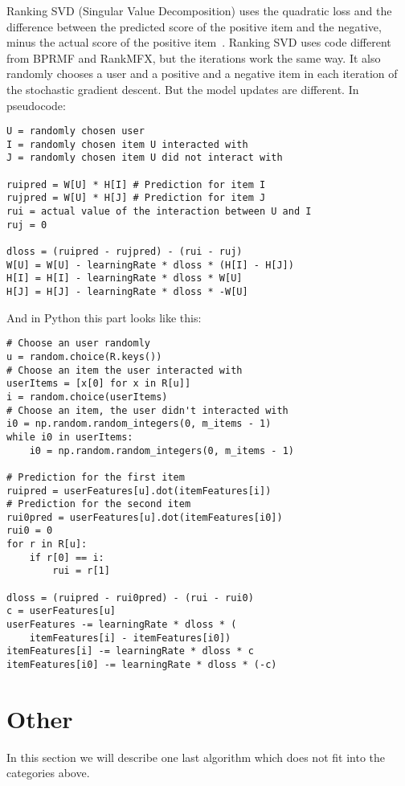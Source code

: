 Ranking SVD (Singular Value Decomposition) uses the quadratic loss and the difference between the
predicted score of the positive item and the negative, minus the actual
score of the positive item~\cite{jahrer2011collaborative}.
Ranking SVD uses code different from BPRMF and RankMFX, but the iterations
work the same way. It also randomly chooses a user and a positive and a
negative item in each iteration of the stochastic gradient descent. 
But the model updates are different. In pseudocode:
\begin{lstlisting}[style=pseudocode]
U = randomly chosen user
I = randomly chosen item U interacted with
J = randomly chosen item U did not interact with

ruipred = W[U] * H[I] # Prediction for item I
rujpred = W[U] * H[J] # Prediction for item J
rui = actual value of the interaction between U and I 
ruj = 0

dloss = (ruipred - rujpred) - (rui - ruj)
W[U] = W[U] - learningRate * dloss * (H[I] - H[J])
H[I] = H[I] - learningRate * dloss * W[U]
H[J] = H[J] - learningRate * dloss * -W[U]
\end{lstlisting}
And in Python this part looks like this:
\begin{lstlisting}[style=python]
# Choose an user randomly
u = random.choice(R.keys())
# Choose an item the user interacted with
userItems = [x[0] for x in R[u]]
i = random.choice(userItems)
# Choose an item, the user didn't interacted with
i0 = np.random.random_integers(0, m_items - 1)
while i0 in userItems:
    i0 = np.random.random_integers(0, m_items - 1)

# Prediction for the first item
ruipred = userFeatures[u].dot(itemFeatures[i])
# Prediction for the second item
rui0pred = userFeatures[u].dot(itemFeatures[i0])
rui0 = 0
for r in R[u]:
    if r[0] == i:
        rui = r[1]

dloss = (ruipred - rui0pred) - (rui - rui0)
c = userFeatures[u]
userFeatures -= learningRate * dloss * (
    itemFeatures[i] - itemFeatures[i0])
itemFeatures[i] -= learningRate * dloss * c
itemFeatures[i0] -= learningRate * dloss * (-c)
\end{lstlisting}


\section{Other}
In this section we will describe one last algorithm 
which does not fit into the categories above.
